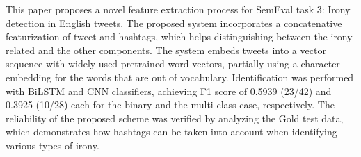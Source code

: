 This paper proposes a novel feature extraction process for SemEval task 3: Irony detection in English tweets. The proposed system incorporates a concatenative featurization of tweet and hashtags, which helps distinguishing between the irony-related and the other components. The system embeds tweets into a vector sequence with widely used pretrained word vectors, partially using a character embedding for the words that are out of vocabulary. Identification was performed with BiLSTM and CNN classifiers, achieving F1 score of 0.5939 (23/42) and 0.3925 (10/28) each for the binary and the multi-class case, respectively. The reliability of the proposed scheme was verified by analyzing the Gold test data, which demonstrates how hashtags can be taken into account when identifying various types of irony.
